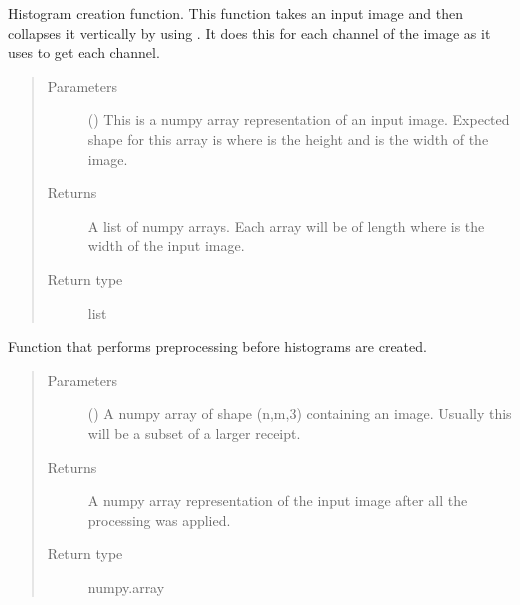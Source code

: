 \documentclass[letterpaper,10pt,english]{sphinxmanual}
\begin{document}
\begin{fulllineitems}
\label{\detokenize{api:readpyne.core.hist}}
Histogram creation function. This function takes an input image and then
collapses it vertically by using . It does this for each channel
of the image as it uses  to get each channel.
\begin{quote}\begin{description}
\item[{Parameters}] \leavevmode
{} () \textendash{} This is a numpy array representation of an input image. Expected shape
for this array is  where  is the height and  is the
width of the image.

\item[{Returns}] \leavevmode
A list of numpy arrays. Each array will be of length  where
 is the width of the input image.

\item[{Return type}] \leavevmode
list

\end{description}\end{quote}

\end{fulllineitems}


\begin{fulllineitems}
\label{\detokenize{api:readpyne.core.process}}
Function that performs preprocessing before histograms are created.
\begin{quote}\begin{description}
\item[{Parameters}] \leavevmode
{} () \textendash{} A numpy array of shape (n,m,3) containing an image.
Usually this will be a subset of a larger receipt.

\item[{Returns}] \leavevmode
A numpy array representation of the input image after
all the processing was applied.

\item[{Return type}] \leavevmode
numpy.array

\end{description}\end{quote}

\end{fulllineitems}
\end{document}
